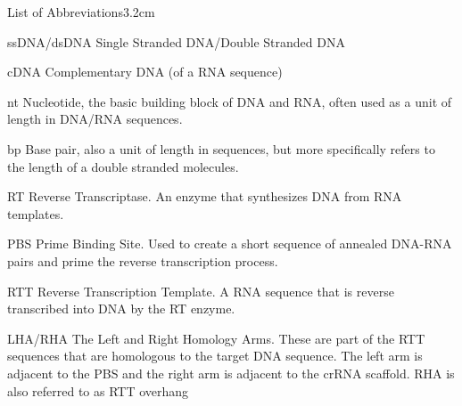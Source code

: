 \begin{mclistof}{List of Abbreviations}{3.2cm}

    \item[ssDNA/dsDNA] Single Stranded DNA/Double Stranded DNA
    
    \item[cDNA] Complementary DNA (of a RNA sequence)
    
    \item[nt] Nucleotide, the basic building block of DNA and RNA, often used as a unit of length in DNA/RNA sequences.
    
    \item[bp] Base pair, also a unit of length in sequences, but more specifically refers to the length of a double stranded molecules.   

    \item[RT] Reverse Transcriptase. An enzyme that synthesizes DNA from RNA templates.

    \item[PBS] Prime Binding Site. Used to create a short sequence of annealed DNA-RNA pairs and prime the reverse transcription process. 

    \item[RTT] Reverse Transcription Template. A RNA sequence that is reverse transcribed into DNA by the RT enzyme.

    \item[LHA/RHA] The Left and Right Homology Arms. These are part of the RTT sequences that are homologous to the target DNA sequence. The left arm is adjacent to the PBS and the right arm is adjacent to the crRNA scaffold. RHA is also referred to as RTT overhang

\end{mclistof} 